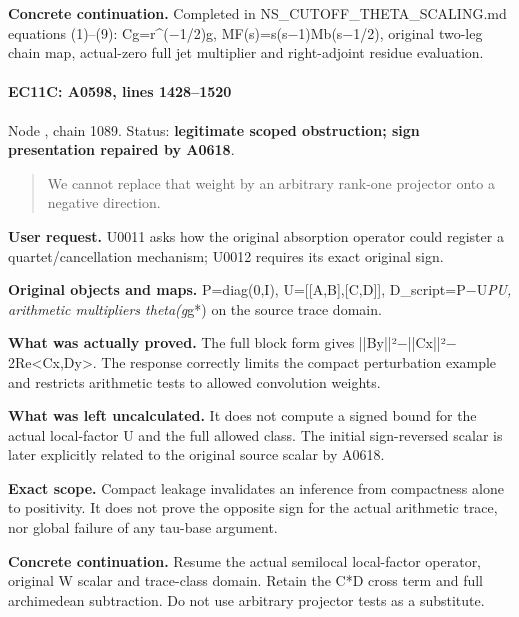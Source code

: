 \textbf{Concrete continuation.} Completed in
NS\_CUTOFF\_THETA\_SCALING.md equations (1)--(9):
Cg=r\textasciicircum{}(\allowbreak{}\ensuremath{−}\allowbreak{}1/2)g,
MF(s)=s(s\allowbreak{}\ensuremath{−}\allowbreak{}1)Mb(s\allowbreak{}\ensuremath{−}\allowbreak{}1/2),
original two-leg chain map, actual-zero full jet multiplier and
right-adjoint residue evaluation.

\paragraph{EC11C: A0598, lines
1428--1520}\label{ec11c-a0598-lines-14281520}

Node \protect{}, chain 1089.
Status: \textbf{legitimate scoped obstruction; sign presentation
repaired by A0618}.

\begin{quote}
We cannot replace that weight by an arbitrary rank-one projector onto a
negative direction.
\end{quote}

\textbf{User request.} U0011 asks how the original absorption operator
could register a quartet/cancellation mechanism; U0012 requires its
exact original sign.

\textbf{Original objects and maps.} P=diag(0,I),
U={[}{[}A,B{]},{[}C,D{]}{]},
D\_script=P\allowbreak{}\ensuremath{−}\allowbreak{}U\emph{PU, arithmetic
multipliers theta(g}g*) on the source trace domain.

\textbf{What was actually proved.} The full block form gives
||By||²\allowbreak{}\ensuremath{−}\allowbreak{}||Cx||²\allowbreak{}\ensuremath{−}\allowbreak{}2Re<Cx,Dy>.
The response correctly limits the compact perturbation example and
restricts arithmetic tests to allowed convolution weights.

\textbf{What was left uncalculated.} It does not compute a signed bound
for the actual local-factor U and the full allowed class. The initial
sign-reversed scalar is later explicitly related to the original source
scalar by A0618.

\textbf{Exact scope.} Compact leakage invalidates an inference from
compactness alone to positivity. It does not prove the opposite sign for
the actual arithmetic trace, nor global failure of any tau-base
argument.

\textbf{Concrete continuation.} Resume the actual semilocal local-factor
operator, original W scalar and trace-class domain. Retain the C*D cross
term and full archimedean subtraction. Do not use arbitrary projector
tests as a substitute.

